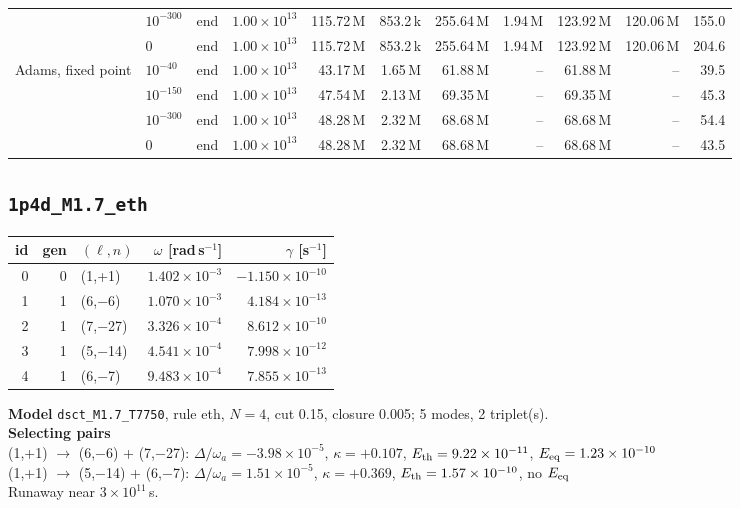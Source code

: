{\begin{tabular}{@{}llllrrrrrrr@{}}
 & $10^{-300}$ & end & $1.00\times10^{13}$ & 115.72\,M & 853.2\,k & 255.64\,M & 1.94\,M & 123.92\,M & 120.06\,M & 155.0 \\
 & $0$ & end & $1.00\times10^{13}$ & 115.72\,M & 853.2\,k & 255.64\,M & 1.94\,M & 123.92\,M & 120.06\,M & 204.6 \\
\addlinespace[2pt]
Adams, fixed point & $10^{-40}$ & end & $1.00\times10^{13}$ & 43.17\,M & 1.65\,M & 61.88\,M & -- & 61.88\,M & -- & 39.5 \\
 & $10^{-150}$ & end & $1.00\times10^{13}$ & 47.54\,M & 2.13\,M & 69.35\,M & -- & 69.35\,M & -- & 45.3 \\
 & $10^{-300}$ & end & $1.00\times10^{13}$ & 48.28\,M & 2.32\,M & 68.68\,M & -- & 68.68\,M & -- & 54.4 \\
 & $0$ & end & $1.00\times10^{13}$ & 48.28\,M & 2.32\,M & 68.68\,M & -- & 68.68\,M & -- & 43.5 \\
\bottomrule
\end{tabular}}

\clearpage
\subsection{\texttt{1p4d\_M1.7\_eth}}\label{net:1p4d_M1.7_eth}
\noindent\begin{minipage}[t]{0.43\textwidth}\vspace{0pt}\footnotesize
\begin{tabular}{@{}rrlrr@{}}
\toprule
id & gen & $(\ell,n)$ & $\omega$ [rad\,s$^{-1}$] & $\gamma$ [s$^{-1}$] \\
\midrule
0 & 0 & (1,+1) & $1.402\times10^{-3}$ & $-1.150\times10^{-10}$ \\
1 & 1 & (6,$-$6) & $1.070\times10^{-3}$ & $4.184\times10^{-13}$ \\
2 & 1 & (7,$-$27) & $3.326\times10^{-4}$ & $8.612\times10^{-10}$ \\
3 & 1 & (5,$-$14) & $4.541\times10^{-4}$ & $7.998\times10^{-12}$ \\
4 & 1 & (6,$-$7) & $9.483\times10^{-4}$ & $7.855\times10^{-13}$ \\
\bottomrule
\end{tabular}
\end{minipage}\hfill
\begin{minipage}[t]{0.55\textwidth}\vspace{0pt}\footnotesize
\textbf{Model} \texttt{dsct\_M1.7\_T7750}, rule eth, $N=4$, cut 0.15,
closure 0.005; 5 modes, 2 triplet(s).\\[2pt]
\textbf{Selecting pairs}\\ (1,+1) $\to$ (6,$-$6) + (7,$-$27): $\Delta/\omega_a=-3.98\times10^{-5}$, $\kappa=+0.107$, $E_{\rm th}=9.22\times10^{-11}$, $E_{\rm eq}=1.23\times10^{-10}$\\
(1,+1) $\to$ (5,$-$14) + (6,$-$7): $\Delta/\omega_a=1.51\times10^{-5}$, $\kappa=+0.369$, $E_{\rm th}=1.57\times10^{-10}$, no $E_{\rm eq}$\\[2pt]
Runaway near $3\times10^{11}$\,s.
\end{minipage}

